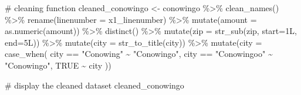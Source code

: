 \documentclass[
  letterpaper,
  DIV=11,
  numbers=noendperiod]{scrreprt}
\newenvironment{Shaded}{\begin{snugshade}}{\end{snugshade}}
\newcommand{\AttributeTok}[1]{\textcolor[rgb]{0.40,0.45,0.13}{#1}}
\newcommand{\CommentTok}[1]{\textcolor[rgb]{0.37,0.37,0.37}{#1}}
\newcommand{\ConstantTok}[1]{\textcolor[rgb]{0.56,0.35,0.01}{#1}}
\newcommand{\FunctionTok}[1]{\textcolor[rgb]{0.28,0.35,0.67}{#1}}
\newcommand{\NormalTok}[1]{\textcolor[rgb]{0.00,0.23,0.31}{#1}}
\newcommand{\OtherTok}[1]{\textcolor[rgb]{0.00,0.23,0.31}{#1}}
\newcommand{\SpecialCharTok}[1]{\textcolor[rgb]{0.37,0.37,0.37}{#1}}
\newcommand{\StringTok}[1]{\textcolor[rgb]{0.13,0.47,0.30}{#1}}
\begin{document}
\begin{Shaded}
\begin{Highlighting}[]
\CommentTok{\# cleaning function}
\NormalTok{cleaned\_conowingo }\OtherTok{\textless{}{-}}\NormalTok{ conowingo }\SpecialCharTok{\%\textgreater{}\%}
  \FunctionTok{clean\_names}\NormalTok{() }\SpecialCharTok{\%\textgreater{}\%} 
  \FunctionTok{rename}\NormalTok{(}\AttributeTok{linenumber =}\NormalTok{ x1\_linenumber) }\SpecialCharTok{\%\textgreater{}\%} 
  \FunctionTok{mutate}\NormalTok{(}\AttributeTok{amount =} \FunctionTok{as.numeric}\NormalTok{(amount)) }\SpecialCharTok{\%\textgreater{}\%} 
  \FunctionTok{distinct}\NormalTok{() }\SpecialCharTok{\%\textgreater{}\%}
  \FunctionTok{mutate}\NormalTok{(}\AttributeTok{zip =} \FunctionTok{str\_sub}\NormalTok{(zip, }\AttributeTok{start=}\NormalTok{1L, }\AttributeTok{end=}\NormalTok{5L)) }\SpecialCharTok{\%\textgreater{}\%}
  \FunctionTok{mutate}\NormalTok{(}\AttributeTok{city =} \FunctionTok{str\_to\_title}\NormalTok{(city)) }\SpecialCharTok{\%\textgreater{}\%}
  \FunctionTok{mutate}\NormalTok{(}\AttributeTok{city =} \FunctionTok{case\_when}\NormalTok{(}
\NormalTok{    city }\SpecialCharTok{==} \StringTok{"Conowing"} \SpecialCharTok{\textasciitilde{}} \StringTok{"Conowingo"}\NormalTok{,}
\NormalTok{    city }\SpecialCharTok{==} \StringTok{"Conowingoo"} \SpecialCharTok{\textasciitilde{}} \StringTok{"Conowingo"}\NormalTok{,}
    \ConstantTok{TRUE} \SpecialCharTok{\textasciitilde{}}\NormalTok{ city}
\NormalTok{  ))}
  

\CommentTok{\# display the cleaned dataset}
\NormalTok{cleaned\_conowingo}
\end{Highlighting}
\end{Shaded}
\end{document}
